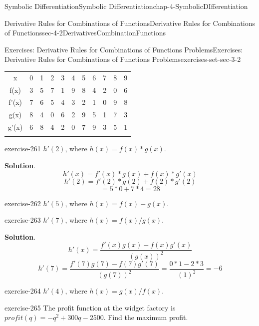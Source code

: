 \documentclass[oneside,10pt,]{book}
\numberwithin{equation}{section}
\newcommand{\hrulethin}  {\noalign{\hrule height 0.04em}}
\newcommand{\hrulethick} {\noalign{\hrule height 0.11em}}
\begin{document}
\begin{chapterptx}{Symbolic Differentiation}{}{Symbolic Differentiation}{}{}{chap-4-SymbolicDIfferentiation}
\begin{sectionptx}{Derivative Rules for Combinations of Functions}{}{Derivative Rules for Combinations of Functions}{}{}{sec-4-2DerivativesCombinationFunctions}
\begin{exercises-subsection}{Exercises: Derivative Rules for Combinations of Functions Problems}{}{Exercises: Derivative Rules for Combinations of Functions Problems}{}{}{exercises-set-sec-3-2}
\begin{sidebyside}{1}{0}{0}{0}
\begin{sbspanel}{1}
{\centering%
\begin{tabular}{ccccccccccc}\hrulethick
x&0&1&2&3&4&5&6&7&8&9\tabularnewline\hrulethin
f(x)&3&5&7&1&9&8&4&2&0&6\tabularnewline\hrulethin
f'(x)&7&6&5&4&3&2&1&0&9&8\tabularnewline\hrulethin
g(x)&8&4&0&6&2&9&5&1&7&3\tabularnewline\hrulethin
g'(x)&6&8&4&2&0&7&9&3&5&1\tabularnewline\hrulethin
\end{tabular}
\par}
\end{sbspanel}%
\end{sidebyside}%
%
\begin{divisionexercise}{19}{}{}{exercise-261}%
\hypertarget{p-1598}{}%
\(h'(2)\), where \(h(x)=f(x)*g(x)\).%
\par\smallskip%
\noindent\textbf{Solution}.\hypertarget{solution-130}{}\quad%
%
\begin{equation*}
h' (x)=f' (x)*g(x)+f(x)*g' (x)
\end{equation*}
%
\begin{equation*}
h' (2)=f' (2)*g(2)+f(2)*g' (2)
\end{equation*}
%
\begin{equation*}
=5*0+7*4=28
\end{equation*}
\end{divisionexercise}%
\begin{divisionexercise}{20}{}{}{exercise-262}%
\hypertarget{p-1599}{}%
\(h'(5)\), where \(h(x)=f(x)-g(x)\).%
\end{divisionexercise}%
\begin{divisionexercise}{21}{}{}{exercise-263}%
\hypertarget{p-1600}{}%
\(h'(7)\), where \(h(x)=f(x)/g(x)\).%
\par\smallskip%
\noindent\textbf{Solution}.\hypertarget{solution-131}{}\quad%
%
\begin{equation*}
h'(x)=\frac{f' (x)g(x)-f(x) g' (x)}{(g(x))^2} 
\end{equation*}
%
\begin{equation*}
h' (7)=\frac{f' (7)g(7)-f(7) g' (7)}{(g(7))^2} 
=\frac{0*1-2*3}{(1)^2} =-6
\end{equation*}
\end{divisionexercise}%
\begin{divisionexercise}{22}{}{}{exercise-264}%
\hypertarget{p-1601}{}%
\(h'(4)\), where \(h(x)=g(x)/f(x)\).%
\end{divisionexercise}%
\begin{divisionexercise}{23}{}{}{exercise-265}%
\hypertarget{p-1602}{}%
The profit function at the widget factory is \(profit(q)=-q^2+300q-2500\). Find the maximum profit.%

\end{divisionexercise}
\end{exercises-subsection}
\end{sectionptx}
\end{chapterptx}
\end{document}
